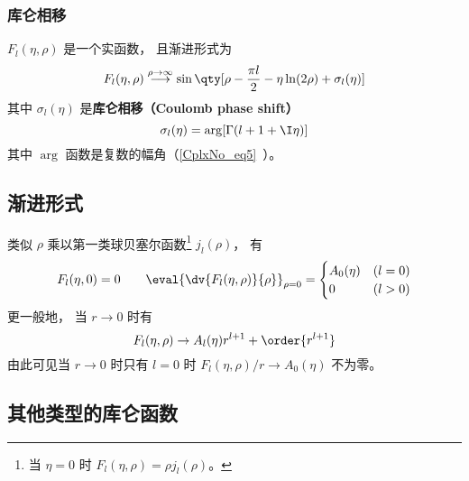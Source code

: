 \subsubsection{库仑相移}
$F_l(\eta, \rho)$ 是一个实函数， 且渐进形式为
\begin{equation}\label{CulmF_eq7} %
F_l(\eta, \rho) \overset{\rho\to \infty}{\longrightarrow} \sin\qty[\rho - \frac{\pi l}{2} - \eta\ln(2\rho) + \sigma_l(\eta)]
\end{equation}
其中 $\sigma_l(\eta)$ 是\textbf{库仑相移（Coulomb phase shift）}
\begin{equation}\label{CulmF_eq8}
\sigma_l(\eta) = \arg[\Gamma(l+1+\I\eta)]
\end{equation}
其中 $\arg$ 函数是复数的幅角（\autoref{CplxNo_eq5}~）。

\subsection{渐进形式}
类似 $\rho$ 乘以第一类球贝塞尔函数\footnote{当 $\eta = 0$ 时 $F_l(\eta, \rho)=\rho j_l(\rho)$。} $j_l(\rho)$， 有
\begin{equation}
F_l(\eta, 0) = 0 \qquad \eval{\dv{F_l(\eta, \rho)}{\rho}}_{\rho=0} = 
\begin{cases}
A_0(\eta) &(l = 0)\\
0     &(l > 0)
\end{cases}
\end{equation}
更一般地， 当 $r\to 0$ 时有
\begin{equation} %
F_l(\eta, \rho) \rightarrow A_l(\eta) r^{l+1} + \order{r^{l+1}}
\end{equation}
由此可见当 $r\to 0$ 时只有 $l = 0$ 时 $F_l(\eta, \rho)/r \to A_0(\eta)$ 不为零。

\subsection{其他类型的库仑函数}

